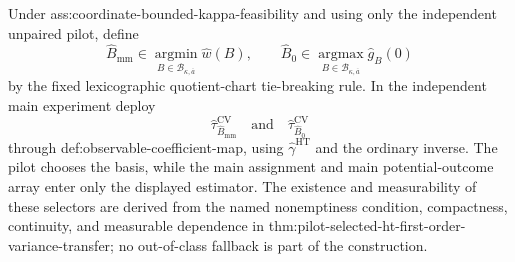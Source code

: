 Under ass:coordinate-bounded-kappa-feasibility and using only the independent unpaired pilot, define
\[
\widehat B_{\mathrm{mm}}
\in\operatorname*{argmin}_{B\in\mathcal B_{\kappa,\overline a}}\widehat w(B),
\qquad
\widehat B_0
\in\operatorname*{argmax}_{B\in\mathcal B_{\kappa,\overline a}}\widehat g_B(0)
\]
by the fixed lexicographic quotient-chart tie-breaking rule.  In the independent main experiment deploy
\[
\widehat\tau_{\widehat B_{\mathrm{mm}}}^{\mathrm{CV}}
\quad\text{and}\quad
\widehat\tau_{\widehat B_0}^{\mathrm{CV}}
\]
through def:observable-coefficient-map, using \(\widehat\gamma^{\mathrm{HT}}\) and the ordinary inverse.  The pilot chooses the basis, while the main assignment and main potential-outcome array enter only the displayed estimator.  The existence and measurability of these selectors are derived from the named nonemptiness condition, compactness, continuity, and measurable dependence in thm:pilot-selected-ht-first-order-variance-transfer; no out-of-class fallback is part of the construction.